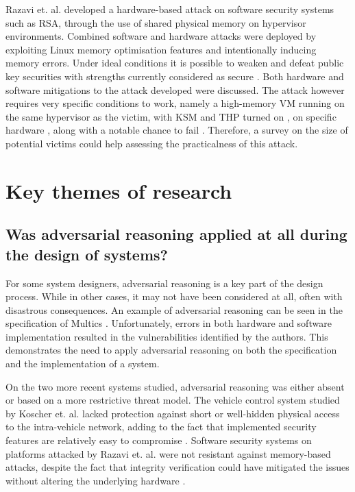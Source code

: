 \documentclass[11pt]{article}
\begin{document}
Razavi et. al. \cite{razavi2016flip} developed a hardware-based attack on software security systems such as RSA, through the use of shared physical memory on hypervisor environments. Combined software and hardware attacks were deployed by exploiting Linux memory optimisation features and intentionally inducing memory errors. Under ideal conditions it is possible to weaken and defeat public key securities with strengths currently considered as secure \cite[Sec. 5]{razavi2016flip}. Both hardware and software mitigations to the attack developed were discussed. The attack however requires very specific conditions to work, namely a high-memory VM \cite[Fig. 4]{razavi2016flip} running on the same hypervisor as the victim, with KSM and THP turned on \cite[4.3.1]{razavi2016flip}, on specific hardware \cite[6.1.1]{razavi2016flip}, along with a notable chance to fail \cite[5.2]{razavi2016flip}. Therefore, a survey on the size of potential victims could help assessing the practicalness of this attack.

\section{Key themes of research}

\subsection{Was adversarial reasoning applied at all during the design of systems?}

For some system designers, adversarial reasoning is a key part of the design process. While in other cases, it may not have been considered at all, often with disastrous consequences. An example of adversarial reasoning can be seen in the specification of Multics \cite[3.1]{karger1974multics}. Unfortunately, errors in both hardware and software implementation \cite[3.2.2, 3.3.1]{karger1974multics} resulted in the vulnerabilities identified by the authors. This demonstrates the need to apply adversarial reasoning on both the specification and the implementation of a system. 

On the two more recent systems studied, adversarial reasoning was either absent or based on a more restrictive threat model. The vehicle control system studied by Koscher et. al. \cite{koscher2010experimental} lacked protection against short or well-hidden physical access to the intra-vehicle network, adding to the fact that implemented security features are relatively easy to compromise \cite[IV. B.]{koscher2010experimental}. Software security systems on platforms attacked by Razavi et. al. \cite{razavi2016flip} were not resistant against memory-based attacks, despite the fact that integrity verification could have mitigated the issues without altering the underlying hardware \cite[6.2]{razavi2016flip}.
\end{document}
